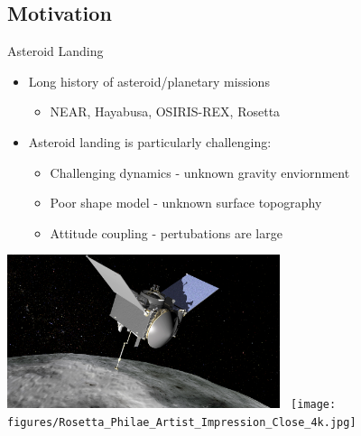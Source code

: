\documentclass[11pt,professionalfonts,aspectratio=169]{beamer}
\begin{document}
\subsection*{Motivation}  
\begin{frame}{Asteroid Landing}
    \begin{itemize}
        \item Long history of asteroid/planetary missions
            \begin{itemize}
                \item NEAR, Hayabusa, OSIRIS-REX, Rosetta
            \end{itemize}
            \pause
        \item Asteroid landing is particularly challenging:
            \begin{itemize}
                \item<2-> Challenging dynamics - unknown gravity enviornment
                \item<2-> Poor shape model - unknown surface topography
                \item<2-> Attitude coupling - pertubations are large 
            \end{itemize}
    \end{itemize}
    \begin{center}
        \includegraphics[width=0.6\textwidth,height=0.4\textheight,keepaspectratio]{figures/osiris_rex.png}~
        \texttt{[image: figures/Rosetta\_Philae\_Artist\_Impression\_Close\_4k.jpg]}
    \end{center} 
\end{frame}
\end{document}
